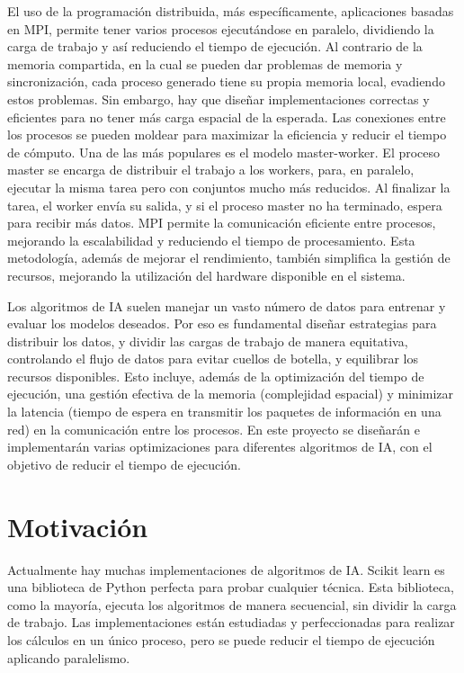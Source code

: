 	El uso de la programación distribuida, más específicamente, aplicaciones basadas en MPI, permite tener varios procesos ejecutándose en paralelo, dividiendo la carga de trabajo y así reduciendo el tiempo de ejecución. Al contrario de la memoria compartida, en la cual se pueden dar problemas de memoria y sincronización, cada proceso generado tiene su propia memoria local, evadiendo estos problemas. Sin embargo, hay que diseñar implementaciones correctas y eficientes para no tener más carga espacial de la esperada. Las conexiones entre los procesos se pueden moldear para maximizar la eficiencia y reducir el tiempo de cómputo. Una de las más populares es el modelo master-worker. El proceso master se encarga de distribuir el trabajo a los workers, para, en paralelo, ejecutar la misma tarea pero con conjuntos mucho más reducidos. Al finalizar la tarea, el worker envía su salida, y si el proceso master no ha terminado, espera para recibir más datos. MPI permite la comunicación eficiente entre procesos, mejorando la escalabilidad y reduciendo el tiempo de procesamiento. Esta metodología, además de mejorar el rendimiento, también simplifica la gestión de recursos, mejorando la utilización del hardware disponible en el sistema. 
	
	Los algoritmos de IA suelen manejar un vasto número de datos para entrenar y evaluar los modelos deseados. Por eso es fundamental diseñar estrategias para distribuir los datos, y dividir las cargas de trabajo de manera equitativa, controlando el flujo de datos para evitar cuellos de botella, y equilibrar los recursos disponibles. Esto incluye, además de la optimización del tiempo de ejecución, una gestión efectiva de la memoria (complejidad espacial) y minimizar la latencia (tiempo de espera en transmitir los paquetes de información en una red) en la comunicación entre los procesos.
	En este proyecto se diseñarán e implementarán varias optimizaciones para diferentes algoritmos de IA, con el objetivo de reducir el tiempo de ejecución.





\section{Motivación}
	Actualmente hay muchas implementaciones de algoritmos de IA. Scikit learn es una biblioteca de Python perfecta para probar cualquier técnica. Esta biblioteca, como la mayoría, ejecuta los algoritmos de manera secuencial, sin dividir la carga de trabajo.  Las implementaciones están estudiadas y perfeccionadas para realizar los cálculos en un único proceso, pero se puede reducir el tiempo de ejecución aplicando paralelismo. 
	
